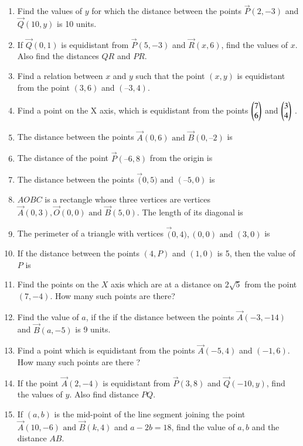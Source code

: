 \begin{enumerate}[label=\thesubsection.\arabic*, ref=\thesubsection.\theenumi]
\item Find the values of $y$ for which the distance between the points                  $\vec{P}(2, -3)$ and $\vec{Q}(10, y)$ is 10 units.
\item  If $\vec{Q}(0,  1)$ is equidistant from $\vec{P}(5,  -3)$ and $\vec{R}(x,  6)$,  find the values of $x$. Also find the
distances $QR$ and $PR$.
\item  Find a relation between $x$ and $y$ such that the point $(x, y)$ is equidistant from the point
$(3,  6)$ and $(– 3,  4)$.
	\item Find a point on the X axis, which is equidistant from the points $\begin{pmatrix}
  7 \\
  6 \\
 \end{pmatrix}$ and $\begin{pmatrix}
  3 \\
  4 \\
 \end{pmatrix}$
.
\label{chapters/11/10/1/4}
%
\item The distance between the points $\vec{A}(0,  6) \text{ and } \vec{B}(0,  –2)$ is
\item The distance of the point $\vec{P} (–6,  8)$ from the origin is
\item The distance between the points $\vec(0,  5)\text{ and }(–5,  0)$ is
\item $AOBC$ is a rectangle whose three vertices are vertices $\vec{A} (0,  3),  \vec{O}(0,  0)\text{ and }
	\vec{B} (5,  0)$. The length of its diagonal is
\item The perimeter of a triangle with vertices $\vec(0,  4),  (0,  0) \text{ and } (3,  0)$ is
\item If the distance between the points $(4, P)$  and $ (1, 0)$ is 5, then the value of $P$ is
\item Find the points on the $X$ axis which are at a distance on $2\sqrt{5}$ from the point $ (7, -4).$ How many such points are there?
\item Find the value of $a$,  if the if the distance between the points $\vec{A}(-3, -14)$  and $\vec{B}(a, -5)$ is 9 units.
\item Find a point which is equidistant from the points $\vec{A}(-5, 4)$  and $(-1, 6)$.  How many such points are there ?
\item If the point $\vec{A}(2, -4)$ is equidistant from $\vec{P}(3, 8)$  and $\vec{Q}(-10, y)$,  find the values of $y$.  Also find distance $PQ$.
\item If $(a, b)$ is the mid-point of the line segment joining the point $\vec{A}(10, -6)\text{ and }\vec{B}(k, 4)$ and $a-2b=18$,  find the value of $a, b$ and the distance $AB$.

\end{enumerate}
